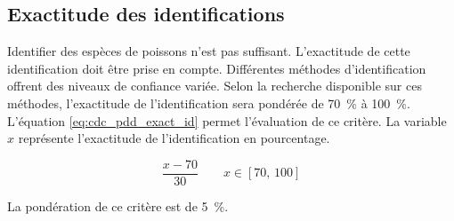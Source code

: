 

\subsection{Exactitude des identifications}
\label{s:cdc_pdd_exact_id}

Identifier des espèces de poissons n’est pas suffisant. L’exactitude de cette identification doit être prise en compte. Différentes méthodes d’identification offrent des niveaux de confiance variée. Selon la recherche disponible sur ces méthodes\cite{10.1093/icesjms/fsx109}, l’exactitude de l’identification sera pondérée de 70~\% à 100~\%. L’équation \ref{eq:cdc_pdd_exact_id} permet l’évaluation de ce critère. La variable $x$ représente l'exactitude de l'identification en pourcentage.

\begin{equation} \label{eq:cdc_pdd_exact_id}
\frac{x-70}{30} \qquad x \in [70,\,100]
\end{equation}


La pondération de ce critère est de 5~\%.

